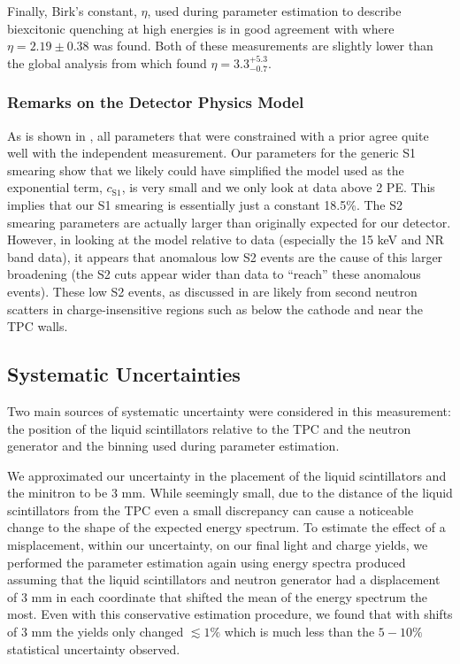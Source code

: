 Finally, Birk's constant, $\eta$, used during parameter estimation to describe biexcitonic quenching at high energies is in good agreement with  where $\eta = 2.19 \pm 0.38$ was found.  Both of these measurements are slightly lower than the global analysis from  which found $\eta = 3.3^{+5.3}_{-0.7}$.


\subsubsection{Remarks on the Detector Physics Model}

As is shown in , all parameters that were constrained with a prior agree quite well with the independent measurement.  Our parameters for the generic S1 smearing show that we likely could have simplified the model used as the exponential term, $c_{\textrm{S1}}$, is very small and we only look at data above 2 PE.  This implies that our S1 smearing is essentially just a constant 18.5\%.  The S2 smearing parameters are actually larger than originally expected for our detector.  However, in looking at the model relative to data (especially the 15 keV and NR band data), it appears that anomalous low S2 events are the cause of this larger broadening (the S2 cuts appear wider than data to ``reach'' these anomalous events).  These low S2 events, as discussed in  are likely from second neutron scatters in charge-insensitive regions such as below the cathode and near the TPC walls.


\subsection{Systematic Uncertainties}


Two main sources of systematic uncertainty were considered in this measurement: the position of the liquid scintillators relative to the TPC and the neutron generator and the binning used during parameter estimation.  

We approximated our uncertainty in the placement of the liquid scintillators and the minitron to be 3 mm.  While seemingly small, due to the distance of the liquid scintillators from the TPC even a small discrepancy can cause a noticeable change to the shape of the expected energy spectrum.  To estimate the effect of a misplacement, within our uncertainty, on our final light and charge yields, we performed the parameter estimation again using energy spectra produced assuming that the liquid scintillators and neutron generator had a displacement of 3 mm in each coordinate that shifted the mean of the energy spectrum the most.  Even with this conservative estimation procedure, we found that with shifts of 3 mm the yields only changed $\lesssim 1\%$ which is much less than the $5-10\%$ statistical uncertainty observed.

